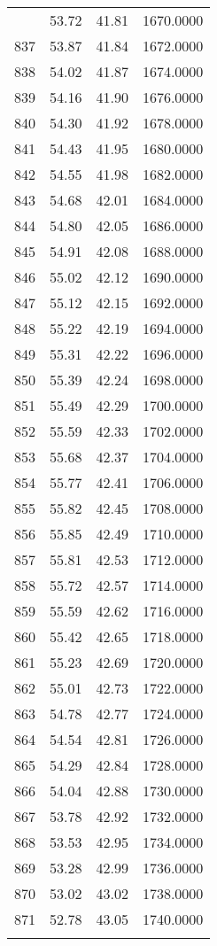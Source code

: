 \documentclass[
  captions=tableheading,
]{scrartcl}
\begin{document}
\begin{longtable} {l|l|l|l}
{836 &	53.72 &	41.81 &	1670.0000\\
837 &	53.87 &	41.84 &	1672.0000\\
838 &	54.02 &	41.87 &	1674.0000\\
839 &	54.16 &	41.90 &	1676.0000\\
840 &	54.30 &	41.92 &	1678.0000\\
841 &	54.43 &	41.95 &	1680.0000\\
842 &	54.55 &	41.98 &	1682.0000\\
843 &	54.68 &	42.01 &	1684.0000\\
844 &	54.80 &	42.05 &	1686.0000\\
845 &	54.91 &	42.08 &	1688.0000\\
846 &	55.02 &	42.12 &	1690.0000\\
847 &	55.12 &	42.15 &	1692.0000\\
848 &	55.22 &	42.19 &	1694.0000\\
849 &	55.31 &	42.22 &	1696.0000\\
850 &	55.39 &	42.24 &	1698.0000\\
851 &	55.49 &	42.29 &	1700.0000\\
852 &	55.59 &	42.33 &	1702.0000\\
853 &	55.68 &	42.37 &	1704.0000\\
854 &	55.77 &	42.41 &	1706.0000\\
855 &	55.82 &	42.45 &	1708.0000\\
856 &	55.85 &	42.49 &	1710.0000\\
857 &	55.81 &	42.53 &	1712.0000\\
858 &	55.72 &	42.57 &	1714.0000\\
859 &	55.59 &	42.62 &	1716.0000\\
860 &	55.42 &	42.65 &	1718.0000\\
861 &	55.23 &	42.69 &	1720.0000\\
862 &	55.01 &	42.73 &	1722.0000\\
863 &	54.78 &	42.77 &	1724.0000\\
864 &	54.54 &	42.81 &	1726.0000\\
865 &	 54.29 & 42.84 & 1728.0000\\
866 &	54.04 &	42.88 &	1730.0000\\
867 &	53.78 &	42.92 &	1732.0000\\
868 &	53.53 &	42.95 &	1734.0000\\
869 &	53.28 &	42.99 &	1736.0000\\
870 &	53.02 &	43.02 &	1738.0000\\
871 &	52.78 &	43.05 &	1740.0000\\
}
\end{longtable}
\end{document}
